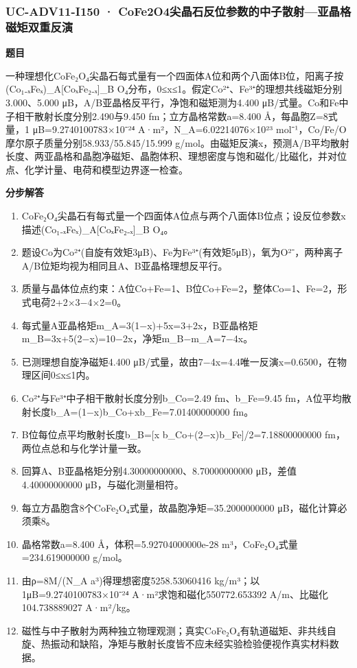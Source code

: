 \documentclass[UTF8,11pt,a4paper]{ctexart}
\begin{document}
\subsubsection*{UC-ADV11-I150 · CoFe2O4尖晶石反位参数的中子散射—亚晶格磁矩双重反演}
\noindent\textbf{题目}\par
一种理想化CoFe₂O₄尖晶石每式量有一个四面体A位和两个八面体B位，阳离子按(Co₁₋ₓFeₓ)\_A[CoₓFe₂₋ₓ]\_B O₄分布，0≤x≤1。假定Co²⁺、Fe³⁺的理想共线磁矩分别3.000、5.000 μB，A/B亚晶格反平行，净饱和磁矩测为4.400 μB/式量。Co和Fe中子相干散射长度分别2.490与9.450 fm；立方晶格常数a=8.400 Å，每晶胞Z=8式量，1 μB=9.2740100783×10⁻²⁴ A·m²，N\_A=6.02214076×10²³ mol⁻¹，Co/Fe/O摩尔原子质量分别58.933/55.845/15.999 g/mol。由磁矩反演x，预测A/B平均散射长度、两亚晶格和晶胞净磁矩、晶胞体积、理想密度与饱和磁化/比磁化，并对位点、化学计量、电荷和模型边界逐一检查。\par
\medskip\noindent\textbf{分步解答}
\begin{enumerate}
\item CoFe₂O₄尖晶石有每式量一个四面体A位点与两个八面体B位点；设反位参数x描述(Co₁₋ₓFeₓ)\_A[CoₓFe₂₋ₓ]\_B O₄。
\item 题设Co为Co²⁺(自旋有效矩3μB)、Fe为Fe³⁺(有效矩5μB)，氧为O²⁻，两种离子A/B位矩均视为相同且A、B亚晶格理想反平行。
\item 质量与晶体位点约束：A位Co+Fe=1、B位Co+Fe=2，整体Co=1、Fe=2，形式电荷2+2×3−4×2=0。
\item 每式量A亚晶格矩m\_A=3(1−x)+5x=3+2x，B亚晶格矩m\_B=3x+5(2−x)=10−2x，净矩m\_B−m\_A=7−4x。
\item 已测理想自旋净磁矩4.400 μB/式量，故由7−4x=4.4唯一反演x=0.6500，在物理区间0≤x≤1内。
\item Co²⁺与Fe³⁺中子相干散射长度分别b\_Co=2.49 fm、b\_Fe=9.45 fm，A位平均散射长度b\_A=(1−x)b\_Co+xb\_Fe=7.01400000000 fm。
\item B位每位点平均散射长度b\_B=[x b\_Co+(2−x)b\_Fe]/2=7.18800000000 fm，两位点总和与化学计量一致。
\item 回算A、B亚晶格矩分别4.30000000000、8.70000000000 μB，差值4.40000000000 μB，与磁化测量相符。
\item 每立方晶胞含8个CoFe₂O₄式量，故晶胞净矩=35.2000000000 μB，磁化计算必须乘8。
\item 晶格常数a=8.400 Å，体积=5.92704000000e-28 m³，CoFe₂O₄式量=234.619000000 g/mol。
\item 由ρ=8M/(N\_A a³)得理想密度5258.53060416 kg/m³；以1μB=9.2740100783×10⁻²⁴ A·m²求饱和磁化550772.653392 A/m、比磁化104.738889027 A·m²/kg。
\item 磁性与中子散射为两种独立物理观测；真实CoFe₂O₄有轨道磁矩、非共线自旋、热振动和缺陷，净矩与散射长度皆不应未经实验检验便视作真实材料数据。
\end{enumerate}
\end{document}
